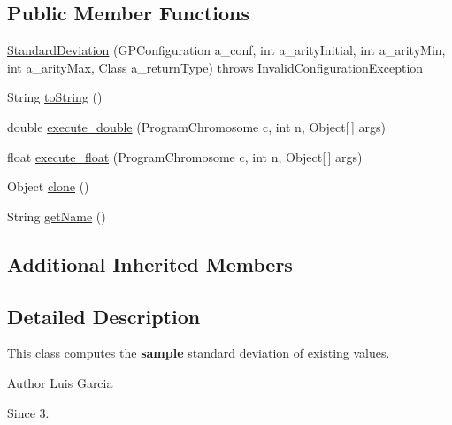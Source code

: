 \subsection*{Public Member Functions}
\begin{DoxyCompactItemize}
\item 
\hyperlink{classorg_1_1jgap_1_1gp_1_1function_1_1statistics_1_1_standard_deviation_a6dea61d5a68602a9b6efa76176669633}{Standard\-Deviation} (G\-P\-Configuration a\-\_\-conf, int a\-\_\-arity\-Initial, int a\-\_\-arity\-Min, int a\-\_\-arity\-Max, Class a\-\_\-return\-Type)  throws Invalid\-Configuration\-Exception 
\item 
String \hyperlink{classorg_1_1jgap_1_1gp_1_1function_1_1statistics_1_1_standard_deviation_a761fcd2c56abfce516afe02d258c986e}{to\-String} ()
\item 
double \hyperlink{classorg_1_1jgap_1_1gp_1_1function_1_1statistics_1_1_standard_deviation_ab1141e9429bf6cd49df5a839453b5b05}{execute\-\_\-double} (Program\-Chromosome c, int n, Object\mbox{[}$\,$\mbox{]} args)
\item 
float \hyperlink{classorg_1_1jgap_1_1gp_1_1function_1_1statistics_1_1_standard_deviation_ad2a70f0e9d6e7f4eb6dfdde1d539ae3a}{execute\-\_\-float} (Program\-Chromosome c, int n, Object\mbox{[}$\,$\mbox{]} args)
\item 
Object \hyperlink{classorg_1_1jgap_1_1gp_1_1function_1_1statistics_1_1_standard_deviation_a369bfaa67f514149d1fd414309020cda}{clone} ()
\item 
String \hyperlink{classorg_1_1jgap_1_1gp_1_1function_1_1statistics_1_1_standard_deviation_a202dae3569869da30cdda4a1c62551d6}{get\-Name} ()
\end{DoxyCompactItemize}
\subsection*{Additional Inherited Members}


\subsection{Detailed Description}
This class computes the {\bfseries sample} standard deviation of existing values.

\begin{DoxyAuthor}{Author}
Luis Garcia 
\end{DoxyAuthor}
\begin{DoxySince}{Since}
3. 
\end{DoxySince}


